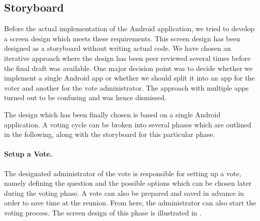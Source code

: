 \documentclass[numbers=noenddot, abstract=on, a4paper, headsepline,
footsepline, oneside, draft=off]{scrreprt}
\begin{document}
\subsection{Storyboard}
Before the actual implementation of the Android application, we tried to develop
a screen design which meets these requirements. This screen design has been
designed as a storyboard without writing actual code. We have chosen an
iterative approach where the design has been peer reviewed several times before
the final draft was available. One major decision point was to decide whether we
implement a single Android app or whether we should split it into an app for the
voter and another for the vote administrator. The approach with multiple apps
turned out to be confusing and was hence dismissed.

The design which has been finally chosen is based on a single Android
application. A voting cycle can be broken into several phases which are outlined
in the following, along with the storyboard for this particular phase.

\paragraph{Setup a Vote.}
The designated administrator of the vote is responsible for setting up a vote,
namely defining the question and the possible options which can be chosen later
during the voting phase. A vote can also be prepared and saved in advance in
order to save time at the reunion. From here, the administrator can also
start the voting process. The screen design of this phase is illustrated in
.
\end{document}
